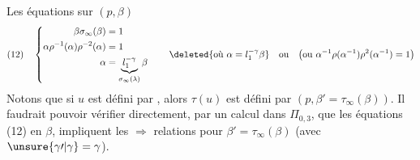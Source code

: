 Les équations sur $(p,\beta)$  
\[
(12)\quad\left\{\begin{aligned}
\beta\sigma_\infty(\beta)&=1\\
\alpha\rho^{-1}(\alpha)\rho^{-2}(\alpha)&=1\\
\alpha&=\underbrace{l_1^{-\gamma}}_{\sigma_\infty(\lambda)}\beta
\end{aligned}\right.
\qquad\deleted{\text{où }\alpha=l_1^{-\gamma}\beta}\quad\text{ou}\quad
\bigl(\text{ou }\alpha^{-1}\rho(\alpha^{-1})\rho^2(\alpha^{-1})=1\bigr)
\]
Notons que si $u$ est défini par \deleted{$\beta$}\inserted{$\beta)$}, alors
$\tau(u)$  est défini par $(p,\beta'=\tau_\infty(\beta))$. Il faudrait pouvoir vérifier directement, par un calcul dans $\Pi_{0,3}$, que les équations (12) en $\beta$, impliquent les $\Rightarrow$ relations pour $\beta'=\tau_\infty(\beta)$ (avec $\unsure{\gamma\prime|\gamma}=\gamma$).
